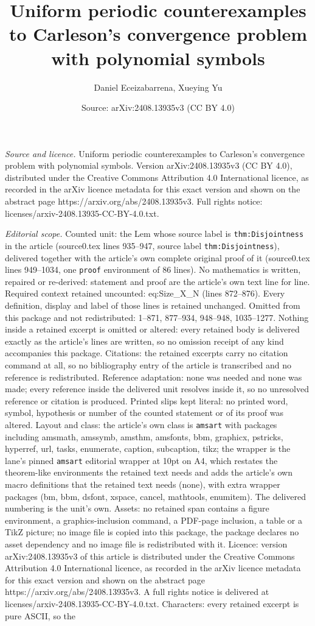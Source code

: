 \documentclass[10pt,a4paper]{amsart}
\title[Uniform periodic counterexamples to Carleson's convergence p]{Uniform periodic counterexamples to Carleson's convergence problem with polynomial symbols}
\author{Daniel Eceizabarrena, Xueying Yu}
\date{Source: arXiv:2408.13935v3 (CC BY 4.0)}
\begin{document}
\maketitle

\noindent\emph{Source and licence.} Uniform periodic counterexamples to Carleson's convergence problem with polynomial symbols. Version arXiv:2408.13935v3 (CC BY 4.0), distributed under the Creative Commons Attribution 4.0 International licence, as recorded in the arXiv licence metadata for this exact version and shown on the abstract page https://arxiv.org/abs/2408.13935v3. Full rights notice: licenses/arxiv-2408.13935-CC-BY-4.0.txt.\par\smallskip

\noindent\textit{Editorial scope.} Counted unit: the Lem whose source label is \texttt{thm:Disjointness} in the article (source0.tex lines 935--947, source label \texttt{thm:Disjointness}), delivered together with the article's own complete original proof of it (source0.tex lines 949--1034, one \texttt{proof} environment of 86 lines). No mathematics is written, repaired or re-derived: statement and proof are the article's own text line for line. Required context retained uncounted: eq:Size\_X\_N (lines 872--876). Every definition, display and label of those lines is retained unchanged. Omitted from this package and not redistributed: 1--871, 877--934, 948--948, 1035--1277. Nothing inside a retained excerpt is omitted or altered: every retained body is delivered exactly as the article's lines are written, so no omission receipt of any kind accompanies this package. Citations: the retained excerpts carry no citation command at all, so no bibliography entry of the article is transcribed and no reference is redistributed. Reference adaptation: none was needed and none was made; every reference inside the delivered unit resolves inside it, so no unresolved reference or citation is produced. Printed slips kept literal: no printed word, symbol, hypothesis or number of the counted statement or of its proof was altered. Layout and class: the article's own class is \texttt{amsart} with packages including amsmath, amssymb, amsthm, amsfonts, bbm, graphicx, pstricks, hyperref, url, tasks, enumerate, caption, subcaption, tikz; the wrapper is the lane's pinned \texttt{amsart} editorial wrapper at 10pt on A4, which restates the theorem-like environments the retained text needs and adds the article's own macro definitions that the retained text needs (none), with extra wrapper packages (bm, bbm, dsfont, xspace, cancel, mathtools, enumitem). The delivered numbering is the unit's own. Assets: no retained span contains a figure environment, a graphics-inclusion command, a PDF-page inclusion, a table or a TikZ picture; no image file is copied into this package, the package declares no asset dependency and no image file is redistributed with it. Licence: version arXiv:2408.13935v3 of this article is distributed under the Creative Commons Attribution 4.0 International licence, as recorded in the arXiv licence metadata for this exact version and shown on the abstract page https://arxiv.org/abs/2408.13935v3. A full rights notice is delivered at licenses/arxiv-2408.13935-CC-BY-4.0.txt. Characters: every retained excerpt is pure ASCII, so the 
\end{document}
